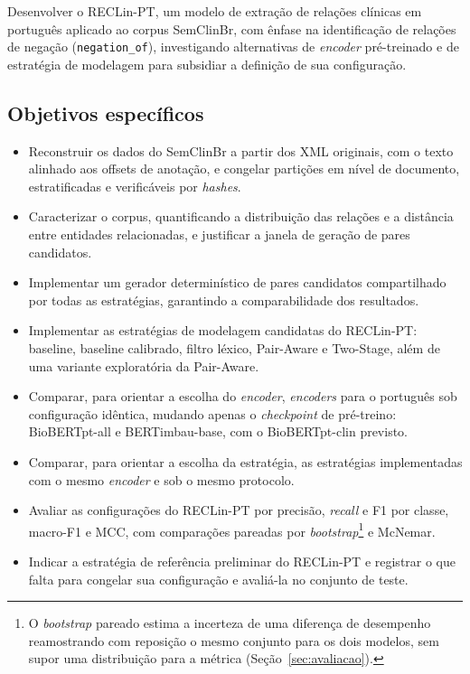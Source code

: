 Desenvolver o RECLin-PT, um modelo de extração de relações clínicas em português
aplicado ao corpus SemClinBr, com ênfase na identificação de relações de negação
(\texttt{negation\_of}), investigando alternativas de \emph{encoder} pré-treinado e
de estratégia de modelagem para subsidiar a definição de sua configuração.

\subsection{Objetivos específicos}

\begin{itemize}
  \item Reconstruir os dados do SemClinBr a partir dos XML originais, com o texto
        alinhado aos offsets de anotação, e congelar partições em nível de
        documento, estratificadas e verificáveis por \emph{hashes}.
  \item Caracterizar o corpus, quantificando a distribuição das relações e a
        distância entre entidades relacionadas, e justificar a janela de geração
        de pares candidatos.
  \item Implementar um gerador determinístico de pares candidatos compartilhado por
        todas as estratégias, garantindo a comparabilidade dos resultados.
  \item Implementar as estratégias de modelagem candidatas do RECLin-PT: baseline,
        baseline calibrado, filtro léxico, Pair-Aware e Two-Stage, além de uma
        variante exploratória da Pair-Aware.
  \item Comparar, para orientar a escolha do \emph{encoder}, \emph{encoders} para o
        português sob configuração idêntica, mudando apenas o \emph{checkpoint} de
        pré-treino: BioBERTpt-all e BERTimbau-base, com o BioBERTpt-clin previsto.
  \item Comparar, para orientar a escolha da estratégia, as estratégias implementadas
        com o mesmo \emph{encoder} e sob o mesmo protocolo.
  \item Avaliar as configurações do RECLin-PT por precisão, \emph{recall} e F1 por
        classe, macro-F1 e MCC, com
        comparações pareadas por \emph{bootstrap}\footnote{O \emph{bootstrap} pareado
        estima a incerteza de uma diferença de desempenho reamostrando com reposição
        o mesmo conjunto para os dois modelos, sem supor uma distribuição para a
        métrica (Seção~\ref{sec:avaliacao}).} e McNemar.
  \item Indicar a estratégia de referência preliminar do RECLin-PT e registrar o que
        falta para congelar sua configuração e avaliá-la no conjunto de teste.
\end{itemize}
